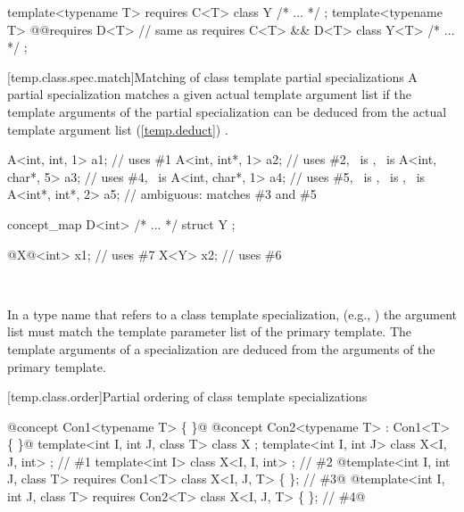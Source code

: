 \documentclass[american]{book}
\begin{document}
\begin{paras}
\begin{codeblock}
template<typename T> requires C<T> class Y { /* ... */ };
template<typename T> 
  @\textcolor{addclr}{}@requires D<T> // same as requires C<T> \&\& D<T>
  class Y<T> { /* ... */ }; 
\end{codeblock}
\color{black}
\addedConcepts{\mbox{\exitexample}}

[temp.class.spec.match]{Matching of class template partial specializations}
\setcounter{Paras}{1}
\pnum
A partial specialization matches a given actual template argument
list if the template arguments of the partial specialization can be
deduced from the actual template argument list (\ref{temp.deduct})
.
\enterexample\ 

\begin{codeblock}
A<int, int, 1>   a1;            // uses \#1
A<int, int*, 1>  a2;            // uses \#2, \ is , \ is 
A<int, char*, 5> a3;            // uses \#4, \ is 
A<int, char*, 1> a4;            // uses \#5, \ is , \ is , \ is 
A<int*, int*, 2> a5;            // ambiguous: matches \#3 and \#5
\end{codeblock}
\color{addclr}
\begin{codeblock}
concept_map D<int> { /* ... */ }
struct Y { };

@\textcolor{addclr}{X}@<int> x1;                     // uses \#7
X<Y> x2;                       // uses \#6
\end{codeblock}
\color{black}
\exitexample\ 

\setcounter{Paras}{3}
\pnum
In a type name that refers to a class template specialization, (e.g.,
)
the argument list must match the template parameter list of the primary
template. 
The template arguments of a specialization are deduced from the arguments
of the primary template.

[temp.class.order]{Partial ordering of class template specializations}
\setcounter{Paras}{1}
\pnum
\enterexample\ 
\begin{codeblock}
@\textcolor{addclr}{concept Con1<typename T> \{ \}}@
@\textcolor{addclr}{concept Con2<typename T> : Con1<T> \{ \}}@
template<int I, int J, class T> class X { };
template<int I, int J>          class X<I, J, int> { }; // \#1
template<int I>                 class X<I, I, int> { }; // \#2
@\textcolor{addclr}{template<int I, int J, class T> requires Con1<T> class X<I, J, T> \{ \}; // \#3}@
@\textcolor{addclr}{template<int I, int J, class T> requires Con2<T> class X<I, J, T> \{ \}; // \#4}@


\end{codeblock}
\end{paras}
\end{document}
